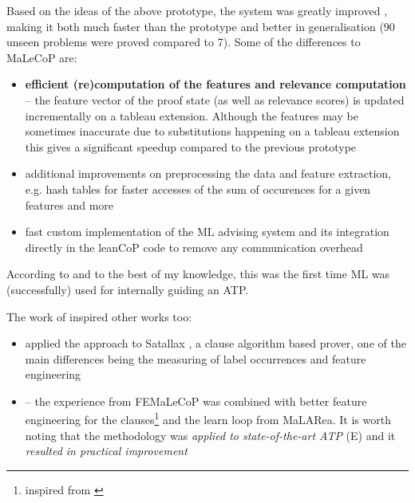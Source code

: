 \documentclass{article}
\begin{document}
Based on the ideas of the above prototype, the system was greatly improved
\citep{femalecop}, making it both much faster than the prototype and better in
generalisation (90 unseen problems were proved compared to 7). Some of the
differences to MaLeCoP are:
\begin{itemize}
    \item \textbf{efficient (re)computation of the features and relevance
        computation} -- the feature vector of the proof state (as well as
        relevance scores) is updated incrementally on a tableau extension.
        Although the features may be sometimes inaccurate due to substitutions
        happening on a tableau extension this gives a significant speedup compared to
        the previous prototype
    \item additional improvements on preprocessing the data and feature
        extraction, e.g. hash tables for faster accesses of the sum of
        occurences for a given features and more
    \item fast custom implementation of the ML advising system and its
        integration directly in the leanCoP code to remove any communication
        overhead
\end{itemize}
According to \cite{femalecop} and to the best of my knowledge, this was
the first time ML was (successfully) used for internally guiding an ATP.

The work of \cite{femalecop} inspired other works too:
\begin{itemize}
    \item \cite{Satallax} applied the approach to Satallax
        \citep{SatallaxProver}, a clause algorithm based prover, one of the
        main differences being the measuring of label occurrences and feature
        engineering
    \item \cite{Enigma} -- the experience from FEMaLeCoP was combined with
        better feature engineering for the clauses\footnote{inspired from
        \cite{EFSF}} and the learn loop from MaLARea. It is worth noting that
        the methodology was \emph{applied to state-of-the-art ATP} (E) and
        it \emph{resulted in practical improvement}
\end{itemize}
\end{document}
